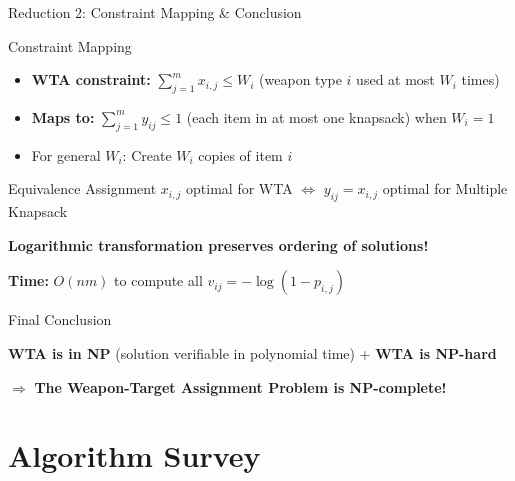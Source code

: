 \documentclass[aspectratio=43,8pt]{beamer}
\begin{document}
\begin{frame}{Reduction 2: Constraint Mapping \& Conclusion}

\begin{block}{Constraint Mapping}
\begin{itemize}
    \item \textbf{WTA constraint:} $\sum_{j=1}^m x_{i,j} \leq W_i$ (weapon type $i$ used at most $W_i$ times)
    \item \textbf{Maps to:} $\sum_{j=1}^m y_{ij} \leq 1$ (each item in at most one knapsack) when $W_i = 1$
    \item For general $W_i$: Create $W_i$ copies of item $i$
\end{itemize}
\end{block}

\begin{exampleblock}{Equivalence}
Assignment $x_{i,j}$ optimal for WTA $\Leftrightarrow$ $y_{ij} = x_{i,j}$ optimal for Multiple Knapsack

\textbf{Logarithmic transformation preserves ordering of solutions!}

\textbf{Time:} $O(nm)$ to compute all $v_{ij} = -\log(1 - p_{i,j})$
\end{exampleblock}

\begin{alertblock}{Final Conclusion}
\begin{center}
\textbf{WTA is in NP} (solution verifiable in polynomial time) + \textbf{WTA is NP-hard}

$\Rightarrow$ \textbf{The Weapon-Target Assignment Problem is NP-complete!}
\end{center}
\end{alertblock}
\end{frame}

\section{Algorithm Survey}
\end{document}
